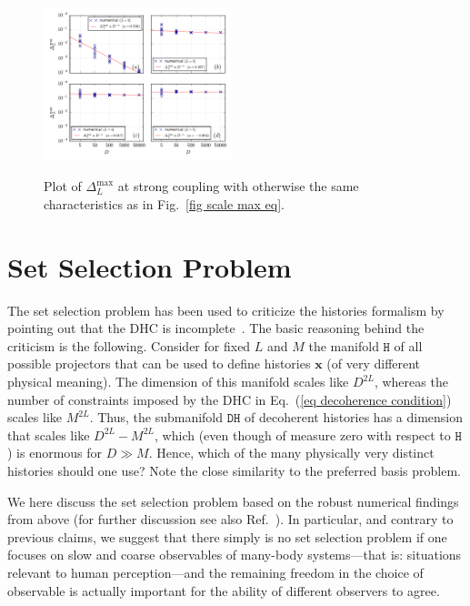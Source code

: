 \documentclass[pre,onecolumn,12pt,aps,longbibliography,nofootinbib]{revtex4-2}
\newcommand{\bb}[1]{\textbf{#1}}
\newcommand{\blue}[1]{#1}
\begin{document}
\begin{figure}[t]
 \centering\includegraphics[width=0.49\textwidth,clip=true]{Max_1_eq.pdf}
 \label{fig scale max eq fast}\vspace{-0.5cm}
 \caption{Plot of $\Delta_L^\text{max}$ at strong coupling with otherwise the same characteristics as in Fig.~\ref{fig scale max eq}. }
\end{figure}

\section{\blue{Set Selection Problem}}
\label{sec consequences}


The set selection problem has been used to criticize the histories formalism by pointing out that the DHC is incomplete~\cite{PazZurekPRD1993, DowkerKentPRL1995, DowkerKentJSP1996, KentPS1998, ZurekRMP2003, RiedelZurekZwolakPRA2016, SchlosshauerPR2019, ZurekEnt2022}. The basic reasoning behind the criticism is the following. Consider for fixed $L$ and $M$ the manifold $\texttt{H}$ of all possible projectors that can be used to define histories $\bb x$ (of very different physical meaning). The dimension of this manifold scales like $D^{2L}$, whereas the number of constraints imposed by the DHC in Eq.~(\ref{eq decoherence condition}) scales like $M^{2L}$. Thus, the submanifold $\texttt{DH}$ of {decoherent} histories has a dimension that scales like $D^{2L} - M^{2L}$, which (even though of measure zero with respect to $\texttt{H}$) is enormous for $D\gg M$. Hence, which of the many physically very distinct histories should one use? Note the close similarity to the preferred basis problem.

\blue{We here discuss the set selection problem based on the robust numerical findings from above (for further discussion see also Ref.~\cite{Griffiths2019}). In particular, and contrary to previous claims, we suggest that there simply is} {no} set selection problem {if} one focuses on slow and coarse observables of many-body systems---that is: situations relevant to human perception---and the remaining \blue{freedom in the choice of observable} is actually important \blue{for the ability of different observers to agree}.
\end{document}
